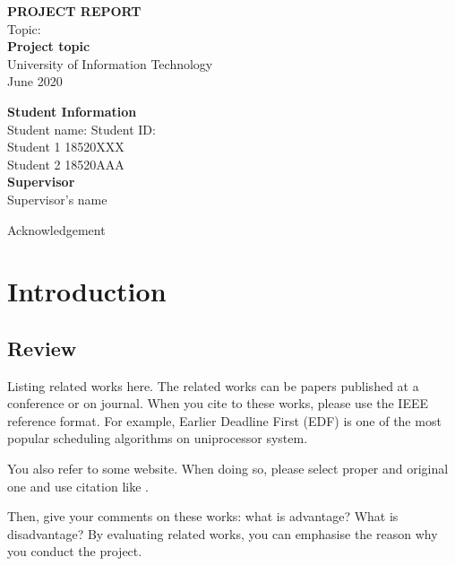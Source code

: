 \documentclass[12pt]{report}
\newcommand\tab[1][1cm]{\hspace*{#1}}
\begin{document}
	
	\thispagestyle{empty}
	\begin{center}
		
		\vspace*{3cm}
		{\bf \LARGE PROJECT REPORT}\\
		\vspace*{2cm}
		Topic:\\
		{\bf \Large Project topic}\\
		\vspace{3cm}
		{\Large University of Information Technology}\\
		\vspace{5cm}
		{\Large June 2020}
	\end{center}
	
	\newpage
	\vspace*{5cm}
	\begin{center}
		{\bf \Large Student Information}\\
		Student name: \tab Student ID:\\
		Student 1 \tab 18520XXX\\
		Student 2 \tab 18520AAA\\
		\vspace{5cm}
		{\bf \Large Supervisor}\\
		Supervisor's name
	\end{center}
	
	\newpage
	 {Acknowledgement}
	
	\tableofcontents
	\listoffigures
	\listoftables
	\chapter{Introduction}
	\section{Review}
	Listing related works here.
	The related works can be papers published at a conference or on journal.
	When you cite to these works,
	please use the IEEE reference format.
	For example,
	Earlier Deadline First (EDF) \cite{ref10} is one of the most popular scheduling algorithms on uniprocessor system.
	
	You also refer to some website.
	When doing so,
	please select proper and original one and use citation like \cite{ref1}.
	
	
	Then, give your comments on these works: what is advantage? What is disadvantage?
	By evaluating related works, 
	you can emphasise the reason why you conduct the project.
	
\end{document}
